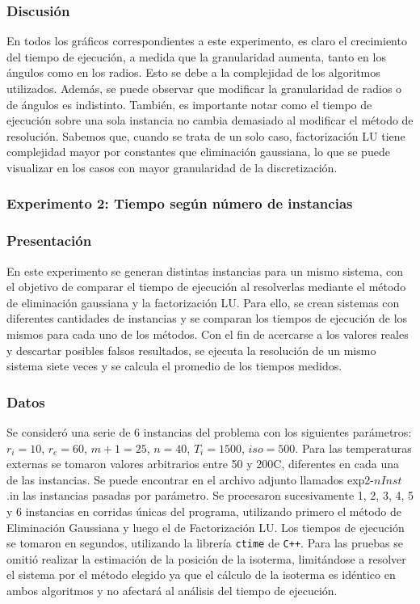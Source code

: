      \subsubsection*{Discusión}
        En todos los gráficos correspondientes a este experimento, es claro el crecimiento del tiempo de ejecución, a medida que la granularidad aumenta, tanto en los ángulos como en los radios. Esto se debe a la complejidad de los algoritmos utilizados. 
        Además, se puede observar que modificar la granularidad de radios o de ángulos es indistinto.
        También, es importante notar como el tiempo de ejecución sobre una sola instancia no cambia demasiado al modificar el método de resolución. Sabemos que, cuando se trata de un solo caso, factorización LU tiene complejidad mayor por constantes que eliminación gaussiana, lo que se puede visualizar en los casos con mayor granularidad de la discretización.


    \subsubsection*{Experimento 2: Tiempo según número de instancias} 

         \subsubsection*{Presentación}
          En este experimento se generan distintas instancias para un mismo sistema, con el objetivo de comparar el tiempo de ejecución al resolverlas mediante el método de eliminación gaussiana y la factorización LU. 
          Para ello, se crean sistemas con diferentes cantidades de instancias y se comparan los tiempos de ejecución de los mismos para cada uno de los métodos. Con el fin de acercarse a los valores reales y descartar posibles falsos resultados, se ejecuta la resolución de un mismo sistema siete veces y se calcula el promedio de los tiempos medidos. 

      \subsubsection*{Datos}
          Se consideró una serie de 6 instancias del problema con los siguientes parámetros: $r_i = 10$, $r_e = 60$, $m+1 = 25$, $n = 40$, $T_i = 1500$, $iso = 500$. Para las temperaturas externas se tomaron valores arbitrarios entre 50 y 200{\degree}C, diferentes en cada una de las instancias. Se puede encontrar en el archivo adjunto llamados exp2-$nInst$.in las instancias pasadas por parámetro.
          Se procesaron sucesivamente 1, 2, 3, 4, 5 y 6 instancias en corridas únicas del programa, utilizando primero el método de Eliminación Gaussiana y luego el de Factorización LU. Los tiempos de ejecución se tomaron en segundos, utilizando la librería \texttt{ctime} de \texttt{C++}. Para las pruebas se omitió realizar la estimación de la posición de la isoterma, limitándose a resolver el sistema por el método elegido ya que el cálculo de la isoterma es idéntico en ambos algoritmos y no afectará al análisis del tiempo de ejecución. 

